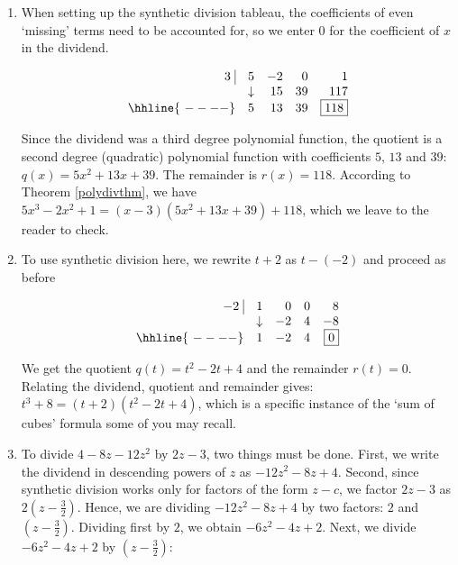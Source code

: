 \begin{exampleSol}

\begin{enumerate}


\item When setting up the synthetic division tableau, the coefficients of even `missing' terms need to be accounted for, so we enter $0$ for the coefficient of $x$ in the dividend.  

\[ \begin{array}{rrrrr}


  3 \, \, \vline& 5 & -2 & 0  & 1 \\

   & \downarrow &  15  &  39  & 117 \\ \hhline{~----} 
  & 5  &   13  & 39  &  \fbox{$118$}  \\  
\end{array}\]

Since the dividend was a third degree polynomial function, the quotient is a second degree (quadratic) polynomial function with coefficients $5$, $13$ and $39$:   $q(x) = 5x^2+13x+39$. The remainder is $r(x) = 118$.  According to Theorem \ref{polydivthm}, we have $5x^3 - 2x^2 + 1 = (x-3)\left(5x^2+13x+39 \right) + 118$, which we leave to the reader to check.

\item  To use synthetic division here, we rewrite $t+2$ as $t-(-2)$ and proceed as before

\[ \begin{array}{rrrrr}
  -2 \, \, \vline& 1 & 0 & 0  & 8 \\
   & \downarrow &  -2  &  4  & -8 \\ \hhline{~----} 
  & 1  &   -2  & 4  &  \fbox{$0$}  \\  
\end{array}\]

We get the quotient $q(t) = t^2-2t+4$ and the remainder $r(t) =0$. Relating the dividend, quotient and remainder gives: $t^3+8 = (t+2)\left( t^2-2t+4 \right)$, which is a specific instance of the `sum of cubes' formula some of you may recall.  

\item To divide $4-8z-12z^2$ by $2z-3$, two things must be done.  First, we write the dividend in descending powers of $z$ as $-12z^2-8z+4$.  Second, since synthetic division works only for factors of the form $z-c$, we factor $2z-3$ as $2\left(z-\frac{3}{2}\right)$.  Hence, we are dividing  $-12z^2-8z+4$ by two factors:  $2$ and $\left(z-\frac{3}{2}\right)$.  Dividing first by $2$, we obtain $-6z^2-4z+2$.  Next, we divide  $-6z^2-4z+2$ by $\left(z-\frac{3}{2}\right)$:


\end{enumerate}
\end{exampleSol}
